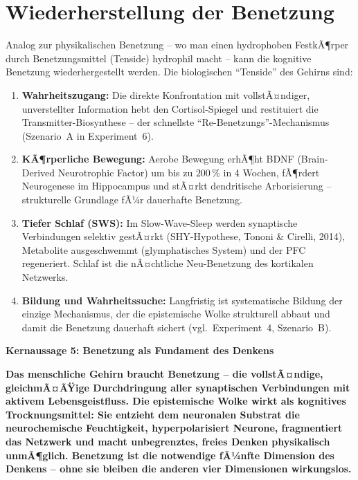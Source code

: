 ﻿\documentclass[12pt,a4paper]{report}
\theoremstyle{plain}
\theoremstyle{definition}
\theoremstyle{remark}
\begin{document}
	\section{Wiederherstellung der Benetzung}

	Analog zur physikalischen Benetzung -- wo man einen hydrophoben
	FestkÃ¶rper durch Benetzungsmittel (Tenside) hydrophil macht --
	kann die kognitive Benetzung wiederhergestellt werden.
	Die biologischen ``Tenside'' des Gehirns sind:

	\begin{enumerate}[label=\textbf{(\arabic*)}]
		\item \textbf{Wahrheitszugang:} Die direkte Konfrontation mit
		vollstÃ¤ndiger, unverstellter Information hebt den Cortisol-Spiegel
		und restituiert die Transmitter-Biosynthese -- der schnellste
		``Re-Benetzungs''-Mechanismus (Szenario~A in Experiment~6).

		\item \textbf{KÃ¶rperliche Bewegung:} Aerobe Bewegung erhÃ¶ht
		BDNF (Brain-Derived Neurotrophic Factor) um bis zu $200\,\%$
		in 4 Wochen, fÃ¶rdert Neurogenese im Hippocampus und
		stÃ¤rkt dendritische Arborisierung -- strukturelle Grundlage fÃ¼r
		dauerhafte Benetzung.

		\item \textbf{Tiefer Schlaf (SWS):} Im Slow-Wave-Sleep werden
		synaptische Verbindungen selektiv gestÃ¤rkt (SHY-Hypothese,
		Tononi \& Cirelli, 2014), Metabolite ausgeschwemmt
		(glymphatisches System) und der PFC regeneriert.
		Schlaf ist die nÃ¤chtliche Neu-Benetzung des kortikalen Netzwerks.

		\item \textbf{Bildung und Wahrheitssuche:} Langfristig ist
		systematische Bildung der einzige Mechanismus, der die
		epistemische Wolke strukturell abbaut und damit die Benetzung
		dauerhaft sichert (vgl.\ Experiment~4, Szenario~B).
	\end{enumerate}

	\bigskip

	
	\noindent\textbf{Kernaussage 5: Benetzung als Fundament des Denkens}

		\textbf{Das menschliche Gehirn braucht Benetzung --
		die vollstÃ¤ndige, gleichmÃ¤ÃŸige Durchdringung aller
		synaptischen Verbindungen mit aktivem Lebensgeistfluss.
		Die epistemische Wolke wirkt als kognitives Trocknungsmittel:
		Sie entzieht dem neuronalen Substrat die neurochemische Feuchtigkeit,
		hyperpolarisiert Neurone, fragmentiert das Netzwerk und
		macht unbegrenztes, freies Denken physikalisch unmÃ¶glich.
		Benetzung ist die notwendige fÃ¼nfte Dimension des Denkens --
		ohne sie bleiben die anderen vier Dimensionen wirkungslos.}
\end{document}
